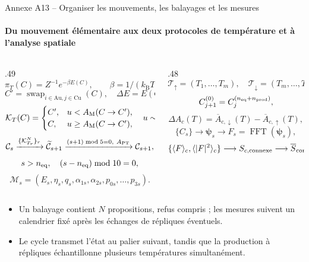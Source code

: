 \documentclass[aspectratio=169,10pt]{beamer}
\newcommand{\kb}{k_{\mathrm B}}
\newcommand{\Au}{\mathrm{Au}}
\newcommand{\Cu}{\mathrm{Cu}}
\newcommand{\deuxpoints}[2]{\par\smallskip\begin{itemize}\setlength{\itemsep}{2pt}\setlength{\parskip}{0pt}\item #1\item #2\end{itemize}}
\begin{document}
\begin{frame}{Annexe A13 -- Organiser les mouvements, les balayages et les mesures}
\framesubtitle{Du mouvement élémentaire aux deux protocoles de température et à l'analyse spatiale}
\begin{columns}[T,onlytextwidth]
\begin{column}{.49\textwidth}
\[
\pi_T(C)=Z^{-1}e^{-\beta E(C)},\qquad\beta=1/(\kb T),
\]
\[
C'=\operatorname{swap}_{i\in\Au,j\in\Cu}(C),\quad
\Delta E=E(C')-E(C),
\]
\[
\mathcal K_T(C)=\begin{cases}C',&u<A_{\rm M}(C\to C'),\\C,&u\ge A_{\rm M}(C\to C'),\end{cases}
\quad u\sim\mathcal U[0,1),
\]
\[
\mathcal C_s\xrightarrow{\{\mathcal K_{T_r}^{N}\}_r}\widetilde{\mathcal C}_{s+1}
\xrightarrow{(s+1)\bmod5=0,\ A_{\rm PT}}\mathcal C_{s+1},
\]
\[
s>n_{\rm eq},\quad (s-n_{\rm eq})\bmod10=0,
\]
\[
\mathcal M_s=(E_s,\eta_s,q_s,\alpha_{1s},\alpha_{2s},p_{0s},\ldots,p_{3s}).
\]
\end{column}
\begin{column}{.48\textwidth}
\[
\mathcal T_\uparrow=(T_1,\ldots,T_m),\quad
\mathcal T_\downarrow=(T_m,\ldots,T_1),
\]
\[
C^{(0)}_{j+1}=C^{(n_{\rm eq}+n_{\rm prod})}_j,
\]
\[
\Delta A_c(T)=\overline A_{c,\downarrow}(T)-\overline A_{c,\uparrow}(T),
\]
\[
\{C_s\}\longrightarrow\boldsymbol\psi_s\longrightarrow F_s=\operatorname{FFT}(\boldsymbol\psi_s),
\]
\[
\{\langle F\rangle_c,\langle|F|^2\rangle_c\}\longrightarrow S_{c,\rm connexe}
\longrightarrow\overline S_{\rm connexe}\longrightarrow\xi_{2,L}.
\]
\end{column}
\end{columns}
\deuxpoints{Un balayage contient $N$ propositions, refus compris ; les mesures suivent un calendrier fixé après les échanges de répliques éventuels.}{Le cycle transmet l'état au palier suivant, tandis que la production à répliques échantillonne plusieurs températures simultanément.}
\end{frame}
\end{document}
